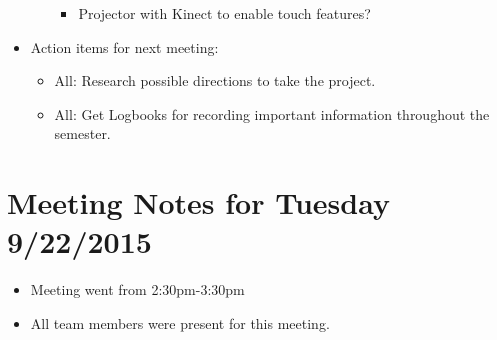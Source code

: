 \documentclass[]{article}
\begin{document}
\begin{itemize}
\begin{itemize}
\begin{itemize}
						\item Projector with Kinect to enable touch features?
					\end{itemize}
			\end{itemize}		
		\item Action items for next meeting:
			\begin{itemize}
				\item All: Research possible directions to take the project.
				\item All: Get Logbooks for recording important information throughout the semester.
			\end{itemize}
	\end{itemize}

\section{Meeting Notes for Tuesday 9/22/2015}
	\begin{itemize}
		\item Meeting went from 2:30pm-3:30pm
		\item All team members were present for this meeting.
	\end{itemize}
\end{document}
